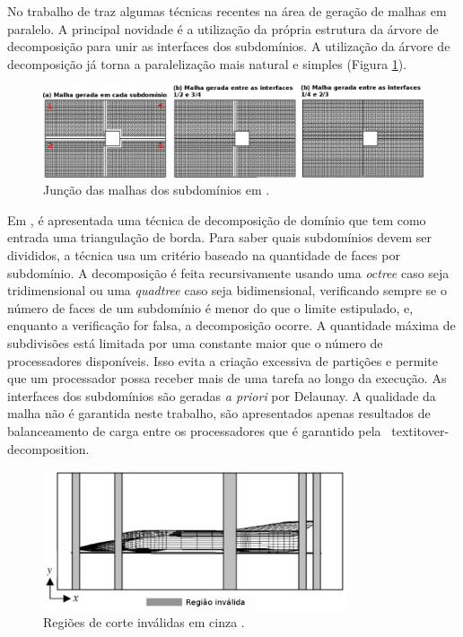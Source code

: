 No trabalho de \cite{bib:LOHNER14} traz algumas técnicas recentes na área de geração de malhas em paralelo. A principal novidade é a utilização da própria estrutura da árvore de decomposição para unir as interfaces dos subdomínios. A utilização da árvore de decomposição já torna a paralelização mais natural e simples (Figura \ref{fig:lohner14}).


 \begin{figure}[htbp]
     \centering
     \includegraphics[width=1.0\textwidth]{fig/lohner14.png}
     \caption{Junção das malhas dos subdomínios em \cite{bib:LOHNER14}.}
     \label{fig:lohner14}
 \end{figure}
 

Em \cite{bib:Larwood03}, é apresentada uma técnica de decomposição de domínio que tem como entrada uma triangulação de borda. Para saber quais subdomínios devem ser divididos, a técnica usa um critério baseado na quantidade de faces por subdomínio. A decomposição é feita recursivamente usando uma \textit{octree} caso seja tridimensional ou uma \textit{quadtree} caso seja bidimensional, verificando sempre se o número de faces de um subdomínio é menor do que o limite estipulado, e, enquanto a verificação for falsa, a decomposição ocorre. A quantidade máxima de subdivisões está limitada por uma constante maior que o número de processadores disponíveis. Isso evita a criação excessiva de partições e permite que um processador possa receber mais de uma tarefa ao longo da execução. As interfaces dos subdomínios são geradas \textit{a priori} por Delaunay. A qualidade da malha não é garantida neste trabalho, são apresentados apenas resultados de balanceamento de carga entre os processadores que é garantido pela \
textit{over-decomposition}.

 \begin{figure}[htbp]
     \centering
     \includegraphics[width=0.8\textwidth]{fig/larwood03.jpg}
     \caption{Regiões de corte inválidas em cinza \cite{bib:Larwood03}.}
     \label{fig:larwood03}
 \end{figure}
 

